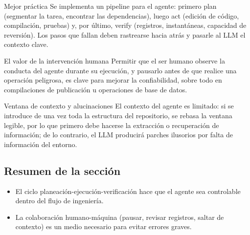\begin{importantbox}{Mejor práctica}
Se implementa un pipeline para el agente: primero plan (segmentar la tarea, encontrar las dependencias), luego act (edición de código, compilación, pruebas) y, por último, verify (registros, instantáneas, capacidad de reversión). Los pasos que fallan deben rastrearse hacia atrás y pasarle al LLM el contexto clave.
\end{importantbox}

\begin{knowledgebox}{El valor de la intervención humana}
Permitir que el ser humano observe la conducta del agente durante su ejecución, y pausarlo antes de que realice una operación peligrosa, es clave para mejorar la confiabilidad, sobre todo en compilaciones de publicación u operaciones de base de datos.
\end{knowledgebox}

\begin{warningbox}{Ventana de contexto y alucinaciones}
El contexto del agente es limitado: si se introduce de una vez toda la estructura del repositorio, se rebasa la ventana legible, por lo que primero debe hacerse la extracción o recuperación de información; de lo contrario, el LLM producirá parches ilusorios por falta de información del entorno.
\end{warningbox}

\subsection{Resumen de la sección}
\begin{itemize}
    \item El ciclo planeación-ejecución-verificación hace que el agente sea controlable dentro del flujo de ingeniería.
    \item La colaboración humano-máquina (pausar, revisar registros, saltar de contexto) es un medio necesario para evitar errores graves.
\end{itemize}
